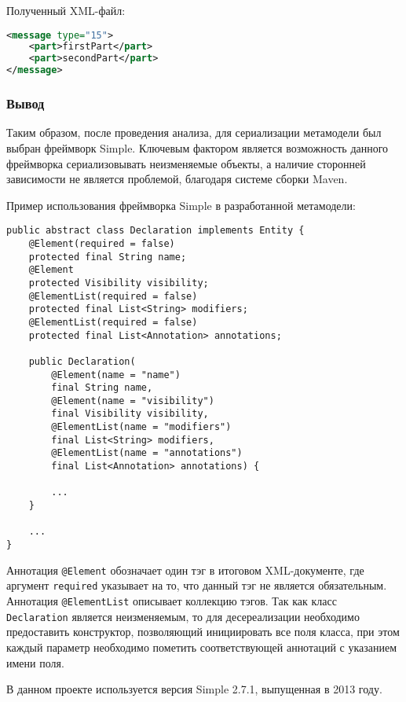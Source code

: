 Полученный XML-файл:

\begin{lstlisting}[language=xml, caption={Полученный XML-файл}]
<message type="15">
    <part>firstPart</part>
    <part>secondPart</part>
</message>
\end{lstlisting}

\subsubsection{Вывод}

Таким образом, после проведения анализа, для сериализации метамодели был выбран
фреймворк Simple. Ключевым фактором является возможность данного фреймворка
сериализовывать неизменяемые объекты, а наличие сторонней зависимости не
является проблемой, благодаря системе сборки Maven.

Пример использования фреймворка Simple в разработанной метамодели:

\begin{lstlisting}[caption={Пример использования фреймворка Simple в реализации метамодели}]
public abstract class Declaration implements Entity {
    @Element(required = false)
    protected final String name;
    @Element
    protected Visibility visibility;
    @ElementList(required = false)
    protected final List<String> modifiers;
    @ElementList(required = false)
    protected final List<Annotation> annotations;

    public Declaration(
        @Element(name = "name")
        final String name,
        @Element(name = "visibility")
        final Visibility visibility,
        @ElementList(name = "modifiers")
        final List<String> modifiers,
        @ElementList(name = "annotations")
        final List<Annotation> annotations) {

        ...
    }

    ...
}
\end{lstlisting}

Аннотация \texttt{@Element} обозначает один тэг в итоговом XML-документе, где
аргумент \texttt{required} указывает на то, что данный тэг не является
обязательным. Аннотация \texttt{@ElementList} описывает коллекцию тэгов. Так как
класс \texttt{Declaration} является неизменяемым, то для десереализации
необходимо предоставить конструктор, позволяющий инициировать все поля класса,
при этом каждый параметр необходимо пометить соответствующей аннотаций с
указанием имени поля.

В данном проекте используется версия Simple 2.7.1, выпущенная в 2013 году.

